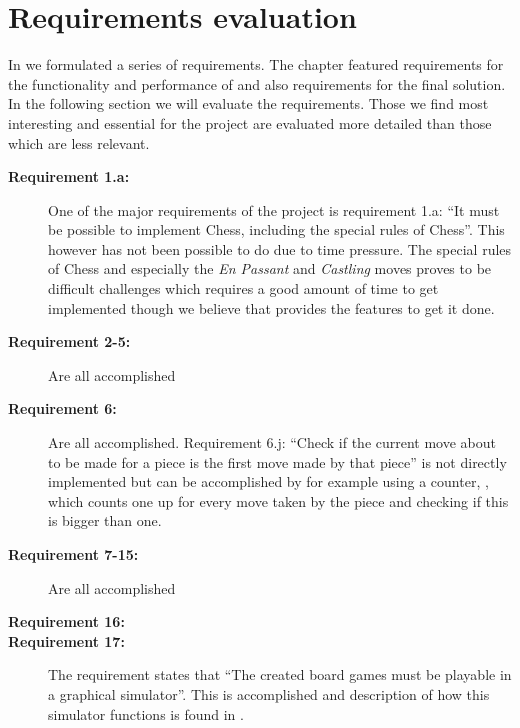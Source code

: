 \section{Requirements evaluation}
\label{sec:requirementsevaluation}

In  we formulated a series of requirements. The chapter featured requirements for the functionality and performance of \productname{} and also requirements for the final solution. In the following section we will evaluate the requirements. Those we find most interesting and essential for the project are evaluated more detailed than those which are less relevant. 

\begin{description}
\item[\textbf{Requirement 1.a:}]
One of the major requirements of the project is requirement 1.a: ``It must be possible to implement Chess, including the special rules of Chess''. This however has not been possible to do due to time pressure. The special rules of Chess and especially the \emph{En Passant} and \emph{Castling} moves proves to be difficult challenges which requires a good amount of time to get implemented though we believe that \productname{} provides the features to get it done.

\item[\textbf{Requirement 2-5:}]
Are all accomplished

\item[\textbf{Requirement 6:}]
Are all accomplished. Requirement 6.j: ``Check if the current move about to be made for a piece is the first move made by that piece'' is not directly implemented but can be accomplished by for example using a counter, , which counts one up for every move taken by the piece and checking if this is bigger than one.

\item[\textbf{Requirement 7-15:}]
Are all accomplished

\item[\textbf{Requirement 16:}]

\item[\textbf{Requirement 17:}]
The requirement states that  ``The created board games must be playable in a graphical simulator''. This is accomplished and description of how this
simulator functions is found in .


\end{description}
